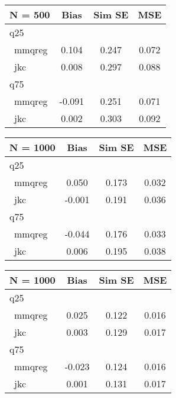 \documentclass[
  authoryear,
  review,
  1p]{elsarticle}
\begin{document}
\begin{table}

\caption{Bias, Simulated Standard error, and Mean Squared
Error}\begin{minipage}[t]{0.50\linewidth}

{\centering 

\begin{longtable}[]{@{}lccc@{}}
\toprule\noalign{}
N = 500 & Bias & Sim SE & MSE \\
\midrule\noalign{}
\endhead
\bottomrule\noalign{}
\endlastfoot
q25 & & & \\
~mmqreg & 0.104 & 0.247 & 0.072 \\
~jkc & 0.008 & 0.297 & 0.088 \\
q75 & & & \\
~mmqreg & -0.091 & 0.251 & 0.071 \\
~jkc & 0.002 & 0.303 & 0.092 \\
\end{longtable}

}

\end{minipage}%
%
\begin{minipage}[t]{0.50\linewidth}

{\centering 

\begin{longtable}[]{@{}lccc@{}}
\toprule\noalign{}
N = 1000 & Bias & Sim SE & MSE \\
\midrule\noalign{}
\endhead
\bottomrule\noalign{}
\endlastfoot
q25 & & & \\
~mmqreg & 0.050 & 0.173 & 0.032 \\
~jkc & -0.001 & 0.191 & 0.036 \\
q75 & & & \\
~mmqreg & -0.044 & 0.176 & 0.033 \\
~jkc & 0.006 & 0.195 & 0.038 \\
\end{longtable}

}

\end{minipage}%
\newline
\begin{minipage}[t]{0.50\linewidth}

{\centering 

\begin{longtable}[]{@{}lccc@{}}
\toprule\noalign{}
N = 1000 & Bias & Sim SE & MSE \\
\midrule\noalign{}
\endhead
\bottomrule\noalign{}
\endlastfoot
q25 & & & \\
~mmqreg & 0.025 & 0.122 & 0.016 \\
~jkc & 0.003 & 0.129 & 0.017 \\
q75 & & & \\
~mmqreg & -0.023 & 0.124 & 0.016 \\
~jkc & 0.001 & 0.131 & 0.017 \\
\end{longtable}

}
\end{minipage}
\end{table}
\end{document}
